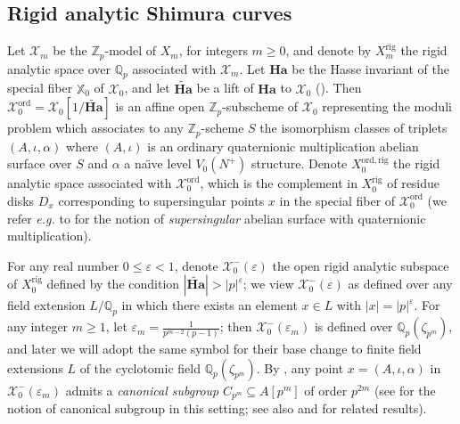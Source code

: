 \documentclass[a4paper,11pt]{amsart}
\numberwithin{equation}{section}
\theoremstyle{plain}
\theoremstyle{definition}
\theoremstyle{remark}
\newcommand{\Q}{\mathbb Q}
\newcommand{\Z}{\mathbb Z}
\newcommand{\ord}{\mathrm{ord}}
\newcommand{\rig}{\mathrm{rig}}
\begin{document}
 \subsection{Rigid analytic Shimura curves} Let ${\mathcal{X}}_m$ be the $\Z_p$-model of $X_m$, for integers $m\geq 0$, and denote by $ X_m^\rig$ the rigid analytic space over $\Q_p$ associated with ${\mathcal{X}}_m$.
 Let $\mathbf{Ha}$ be the Hasse invariant of the special fiber $\mathbb{X}_0$ of $\mathcal{X}_0$, and let $\widetilde{\mathbf{Ha}}$ be a lift of $\mathbf{Ha}$ to $\mathcal{X}_0$ (\cite[\S7]{Kassaei}). Then 
$\mathcal{X}_0^\ord=\mathcal{X}_0[1/\widetilde{\mathbf{Ha}}]$ 
is an affine open $\Z_{p}$-subscheme of $\mathcal{X}_0$ representing  the moduli problem which associates to any $\Z_{p}$-scheme $S$ 
the isomorphism classes of triplets $(A,\iota,\alpha)$ where $(A,\iota)$ is an ordinary quaternionic multiplication abelian surface over $S$ 
and $\alpha$ a na\"{\i}ve level $V_0(N^+)$ structure. 
Denote ${X}_0^{\ord,\rig}$ the rigid analytic space associated with $\mathcal{X}_0^\ord$, which is the complement in $X_0^\rig$ of residue disks $D_x$ corresponding to supersingular points $x$ in the special fiber of $\mathcal{X}_0^\ord$ (we refer \emph{e.g.} to \cite[\S3]{Buz} for the notion of \emph{supersingular} abelian surface with quaternionic multiplication). 

For any real number $0\leq \varepsilon<1$, denote $\mathcal{X}_0^-(\varepsilon)$ the open rigid analytic subspace of ${X}_0^\rig$ defined by the condition $|\widetilde{\mathbf{Ha}}|>|p|^{\varepsilon}$; we view $\mathcal{X}_0^-(\varepsilon)$ as defined over any field extension $L/\Q_p$ in which there exists an element $x\in L$ with 
$|x|=|p|^\varepsilon$. 
For any integer $m\geq 1$, let $\varepsilon_m= \frac{1}{p^{m-2}(p-1)}$; then 
$\mathcal{X}_0^-(\varepsilon_m)$ is defined over $\Q_p(\zeta_{p^m})$, and later we will adopt the same symbol for their base change to finite field extensions $L$ of the cyclotomic field $\Q_p(\zeta_{p^m})$. 
By \cite[Proposition 6.30]{Brasca-Eigen2}, any point $x=(A,\iota,\alpha)$ in $\mathcal{X}_0^-(\varepsilon_m)$ 
admits a \emph{canonical subgroup} $C_{p^m}\subseteq A[p^m]$ of order $p^{2m}$ (see \cite[\S3]{Brasca-Eigen2} for the notion of canonical subgroup in this setting; see also \cite[\S10]{Kassaei} and \cite[\S3.2]{Scholze3} for related results).
\end{document}
